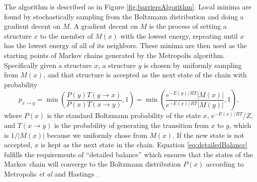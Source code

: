 The algorithm is described as in Figure
\ref{fig:barriersAlgorithm}. Local minima are found by stochastically
sampling from the Boltzmann distribution and doing a gradient decent
on $M$. A gradient decent on $M$ is the process of setting a structure
$x$ to the member of $M(x)$ with the lowest energy, repeating until
$x$ has the lowest energy of all of its neighbors. These minima are
then used as the starting points of Markov chains generated by the
Metropolis algorithm. Specifically given a structure $x$, a structure
$y$ is chosen by uniformly sampling from $M(x)$, and that structure is
accepted as the next state of the chain with probability
\begin{equation}
p_{x\to y} = \min \left ( \frac{ P(y) T(y \to x)}{ P(x) T(x \to y)} , 1 \right ) =  \min \left ( \frac{ e^{-E(y)/RT}  | M(x) |}{ e^{-E(x)/RT} | M(y) |} , 1 \right ),
\label{eq:detailedBalance}
\end{equation}
where $P(x)$ is the standard Boltzmann probability of the state $x$,
$e^{-E(x)/RT}/Z$, and $T(x \to y)$ is the probability of generating
the transition from $x$ to $y$, which is $1/|M(x)|$ because we
uniformly chose from $M(x)$. If the new state is not accepted, $x$ is
kept as the next state in the chain. Equation \ref{eq:detailedBalance}
fulfills the requirements of ``detailed balance'' which ensures that
the states of the Markov chain will converge to the Boltzmann
distribution $P(x)$ according to Metropolis \emph{et al} and Hastings
\cite{metropolis1953equation} \cite{hastings1970monte}.

